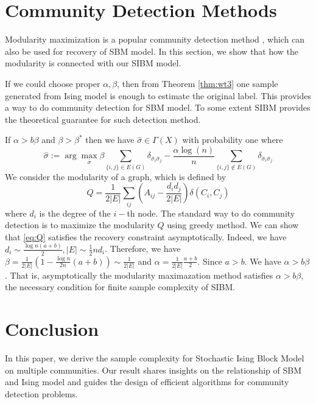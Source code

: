 \documentclass[conference]{IEEEtran}
\newcommand{\ide}[2]{ \delta_{#1 #2} }
\begin{document}
\section{Community Detection Methods}\label{s:cdm}
Modularity maximization is a popular community detection method \cite{clauset2004finding}, which can also be used for recovery of SBM model.
In this section,
we show that how the modularity is connected with our SIBM model.

If we could choose proper $\alpha, \beta$, then from Theorem \ref{thm:wt3} one sample generated from Ising model is enough to
estimate the original label. This provides a way to do community detection for SBM model.
To some extent
SIBM provides the theoretical guarantee for such detection method.

If $\alpha > b \beta$ and $\beta > \beta^*$ then we have $\hat{\sigma} \in \Gamma(X)$ with probability
one where
\begin{equation}\label{eq:hat_sigma}
\hat{\sigma} := \arg\max_{\bar{\sigma}}\beta \sum_{\{i,j\}\in E(G)} \ide{\bar{\sigma}_i}{\bar{\sigma}_j}
-\frac{\alpha\log(n)}{n} \sum_{\{i,j\}\notin E(G)} \ide{\bar{\sigma}_i}{\bar{\sigma}_j} 
\end{equation}
We consider the modularity of a graph, which is defined by
\begin{equation}\label{eq:Q}
	Q = \frac{1}{2 |E|} \sum_{ij} (A_{ij} - \frac{d_i d_j}{2 |E|}) \delta(C_i, C_j)
\end{equation}
where $d_i$ is the degree of the $i-$th node.
The standard way to do community detection is to maximize the modularity $Q$ using greedy method.
We can show that \eqref{eq:Q} satisfies the recovery constraint asymptotically.
Indeed, we have $d_i \sim \frac{\log n(a+b)}{2}, |E| \sim \frac{1}{2}n d_i$. Therefore, we have $\beta = \frac{1}{2|E|}(1-\frac{\log n}{2n}(a+b))
\sim \frac{1}{2|E|}$
and $\alpha = \frac{1}{2|E|}\frac{a+b}{2}$. Since $a>b$. We have $\alpha > b \beta$. That is, asymptotically the modularity maximazation method
satisfies $\alpha > b\beta$, the necessary condition for finite sample complexity of SIBM.

\section{Conclusion}\label{s:conclusion}
In this paper, we derive the sample complexity for Stochastic Ising Block Model on multiple communities.
Our result shares insights on the relationship of SBM and Ising model and guides the design of efficient algorithms
for community detection problems.
\end{document}
